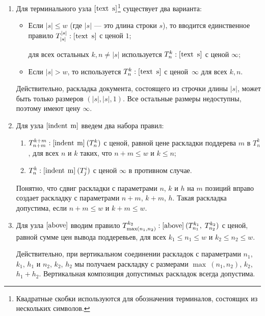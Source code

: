 \begin{enumerate}
\item Для терминального узла $[\mbox{\lstinline{text s}}]$\footnote{
  Квадратные скобки используются для обозначения терминалов, состоящих из нескольких символов.}
  существует два варианта:
  \begin{itemize}
     \item Если $|s|\le w$ (где $|s|$ --- это длина строки $s$), то вводится единственное правило
           $T^{|s|}_{|s|}: [\mbox{\lstinline{text s}}]$ с ценой $1$;
           
           для всех остальных
           $k, n\ne |s|$ используется $T^k_n:[\mbox{\lstinline{text s}}]$ с ценой $\infty$;
     \item Если $|s| > w$, то используется $T^k_n:[\mbox{\lstinline{text s}}]$ с ценой\
       $\infty$ для всех $k, n$.
  \end{itemize}
  Действительно, раскладка документа, состоящего из строчки длины $|s|$, может быть только размеров
  $(|s|, |s|, 1)$. Все остальные размеры недоступны, поэтому имеют цену $\infty$.

\item Для узла $[\mbox{\lstinline{indent m}}]$ введем два набора правил:
  \begin{enumerate}
     \item $T^{k+m}_{n+m}:[\mbox{\lstinline{indent m}}]\:(T^k_n)$ с ценой,
       равной цене раскладки поддерева $m$ в $T_n^k$ , для всех $n$ 
     и $k$ таких, что $n+m\le w$ и $k\le n$;
     \item $T^k_n:[\mbox{\lstinline{indent m}}]\:(T^i_j)$ с ценой $\infty$ в противном случае.
  \end{enumerate}
  Понятно, что сдвиг раскладки с параметрами $n$, $k$ и $h$ на $m$ позиций вправо
  создает раскладку с параметрами $n+m$, $k+m$, $h$. Такая раскладка допустима, если
  $n+m\le w$ и $k+m\le w$.

\item Для узла $[\mbox{\lstinline{above}}]$ вводим правило $T^{k_2}_{\max(n_1, n_2)}:[\mbox{\lstinline{above}}]\:(T^{k_1}_{n_1},\;T^{k_2}_{n_2})$ 
с ценой, равной сумме цен вывода поддеревьев, для всех $k_1\le n_1\le w$ и $k_2 \le n_2 \le w$.

Действительно, при вертикальном соединении раскладок с параметрами
$n_1$, $k_1$, $h_1$ и $n_2$, $k_2$, $h_2$ мы получаем раскладку с размерами
$\max\:(n_1,n_2)$, $k_2$, $h_1+h_2$. Вертикальная композиция допустимых раскладок всегда допустима.


\end{enumerate}
